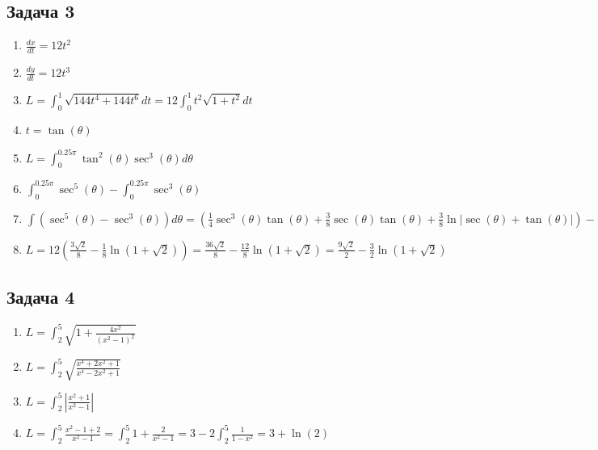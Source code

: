 \documentclass[a4paper,12pt]{article}
\begin{document}
\subsection{Задача 3}
\begin{enumerate}
    \item $\frac{dx}{dt} = 12t^2$
    \item $\frac{dy}{dt} = 12t^3$
    \item $L = \int_{0}^{1} \sqrt{144t^4+144t^6}dt = 12\int_{0}^{1}t^2\sqrt{1+t^2}dt$
    \item $t=\tan(\theta)$
    \item $L = \int_{0}^{0.25\pi} \tan^2(\theta)\sec^3(\theta)d\theta$
    \item $\int_{0}^{0.25\pi}\sec^5(\theta) - \int_{0}^{0.25\pi} \sec^3(\theta)$
    \item $\int (\sec^5(\theta) - \sec^3(\theta)) d\theta = \left(\frac{1}{4}\sec^3(\theta)\tan(\theta) + \frac{3}{8}\sec(\theta)\tan(\theta) + \frac{3}{8}\ln|\sec(\theta) + \tan(\theta)|\right) - \left(\frac{1}{2}\sec(\theta)\tan(\theta) + \frac{1}{2}\ln|\sec(\theta) + \tan(\theta)|\right) = \frac{1}{4}\sec^3(\theta)\tan(\theta) + \left(\frac{3}{8} - \frac{4}{8}\right)\sec(\theta)\tan(\theta) + \left(\frac{3}{8} - \frac{4}{8}\right)\ln|\sec(\theta) + \tan(\theta)| = \frac{1}{4}\sec^3(\theta)\tan(\theta) - \frac{1}{8}\sec(\theta)\tan(\theta) - \frac{1}{8}\ln|\sec(\theta) + \tan(\theta)|$
    \item $L=12\left(\frac{3\sqrt{2}}{8}-\frac{1}{8}\ln(1+\sqrt{2})\right)=\frac{36\sqrt{2}}{8}-\frac{12}{8}\ln(1+\sqrt{2})=\frac{9\sqrt{2}}{2}-\frac{3}{2}\ln(1+\sqrt{2})$
\end{enumerate}

\subsection{Задача 4}

\begin{enumerate}
    \item $L = \int_{2}^{5} \sqrt{1+\frac{4x^2}{(x^2-1)^2}}$
    \item $L = \int_{2}^{5} \sqrt{\frac{x^4+2x^2+1}{x^4-2x^2+1}}$
    \item $L = \int_{2}^{5} |\frac{x^2+1}{x^2-1}|$
    \item $L = \int_{2}^{5} \frac{x^2-1+2}{x^2-1} = \int_{2}^{5} 1+\frac{2}{x^2-1} = 3 - 2\int_{2}^{5} \frac{1}{1-x^2} = 3 + \ln(2)$
\end{enumerate}
\end{document}
